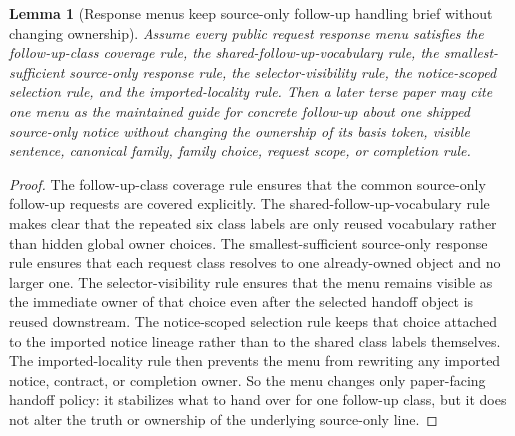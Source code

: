 \documentclass[11pt]{article}
\newtheorem{lemma}{Lemma}
\begin{document}
\begin{lemma}[Response menus keep source-only follow-up handling brief without changing ownership]
Assume every public request response menu satisfies the follow-up-class coverage rule, the shared-follow-up-vocabulary rule, the smallest-sufficient source-only response rule, the selector-visibility rule, the notice-scoped selection rule, and the imported-locality rule.
Then a later terse paper may cite one menu as the maintained guide for concrete follow-up about one shipped source-only notice without changing the ownership of its basis token, visible sentence, canonical family, family choice, request scope, or completion rule.
\end{lemma}

\begin{proof}
The follow-up-class coverage rule ensures that the common source-only follow-up requests are covered explicitly.
The shared-follow-up-vocabulary rule makes clear that the repeated six class labels are only reused vocabulary rather than hidden global owner choices.
The smallest-sufficient source-only response rule ensures that each request class resolves to one already-owned object and no larger one.
The selector-visibility rule ensures that the menu remains visible as the immediate owner of that choice even after the selected handoff object is reused downstream.
The notice-scoped selection rule keeps that choice attached to the imported notice lineage rather than to the shared class labels themselves.
The imported-locality rule then prevents the menu from rewriting any imported notice, contract, or completion owner.
So the menu changes only paper-facing handoff policy: it stabilizes what to hand over for one follow-up class, but it does not alter the truth or ownership of the underlying source-only line.\qedhere
\end{proof}
\end{document}
